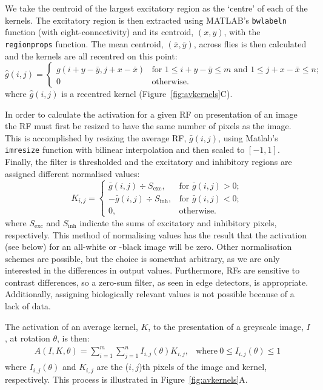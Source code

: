 We take the centroid of the largest excitatory region as the `centre' of each of the kernels.
The excitatory region is then extracted using MATLAB's \texttt{bwlabeln} function (with eight-connectivity) and its centroid, $(x,y)$, with the \texttt{regionprops} function.
The mean centroid, $(\bar{x},\bar{y})$, across flies is then calculated and the kernels are all recentred on this point:
$$
\hat{g}(i,j) = \left\{ \begin{array}{ll} g(i+y-\bar{y},j+x-\bar{x}) & \mbox{for } 1\le i+y-\bar{y}\le m \mbox{ and } 1\le j+x-\bar{x}\le n;\\
0 & \mbox{otherwise.} \end{array} \right.
$$
\noindent where $\hat{g}(i,j)$ is a recentred kernel (Figure~\ref{fig:avkernels}C).

In order to calculate the activation for a given RF on presentation of an image the RF must first be resized to have the same number of pixels as the image.
This is accomplished by resizing the average RF, $\bar{g}(i,j)$, using Matlab's \texttt{imresize} function with bilinear interpolation and then scaled to $[-1,1]$.
Finally, the filter is thresholded and the excitatory and inhibitory regions are assigned different normalised values:
$$
K_{i,j} = \left\{
\begin{array}{rl}
\bar{g}(i,j)\div S_\mathrm{exc}, & \mbox{for } \bar{g}(i,j) > 0; \\
-\bar{g}(i,j)\div S_\mathrm{inh}, & \mbox{for } \bar{g}(i,j) < 0; \\
0, & \mbox{otherwise.}
\end{array}
\right.
$$
\noindent where $S_\mathrm{exc}$ and $S_\mathrm{inh}$ indicate the sums of excitatory and inhibitory pixels, respectively.
This method of normalising values has the result that the activation (see below) for an all-white or -black image will be zero.
Other normalisation schemes are possible, but the choice is somewhat arbitrary, as we are only interested in the differences in output values.
Furthermore, RFs are sensitive to contrast differences, so a zero-sum filter, as seen in edge detectors, is appropriate.
Additionally, assigning biologically relevant values is not possible because of a lack of data.

The activation of an average kernel, $K$, to the presentation of a greyscale image, $I$, at rotation $\theta$, is then:
\begin{equation}
\label{eq:act}
\begin{array}{rl}
A(I,K,\theta) = {\sum\limits^m_{i=1} \sum\limits^n_{j=1} I_{i,j}(\theta)K_{i,j}}, &\mathrm{where\ } 0 \le I_{i,j}(\theta) \le 1
\end{array}
\end{equation}
where $I_{i,j}(\theta)$ and $K_{i,j}$ are the ($i,j$)th pixels of the image and kernel, respectively. This process is illustrated in Figure~\ref{fig:avkernels}A.

